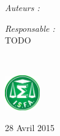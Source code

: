 \begin{titlepage}
\begin{center}
\begin{minipage}[t]{0.3\textwidth}
  \begin{flushleft} \large
    \emph{Auteurs :}\\
    \reportauthor
  \end{flushleft}
\end{minipage}
\begin{minipage}[t]{0.6\textwidth}
  \begin{flushright} \large
    \emph{Responsable :} \\
    TODO \\%
  \end{flushright}
\end{minipage}

\vfill

~\vspace*{14mm}

\begin{minipage}[t]{0.48\textwidth}
  \begin{flushleft}
    \centering \includegraphics [width=15mm]{images/logo-isfa.jpg} \\[0.5cm]
    \begin{spacing}{1.5}
    \end{spacing}
  \end{flushleft}
\end{minipage}


{\large 28 Avril 2015}

\end{center}

\end{titlepage}
